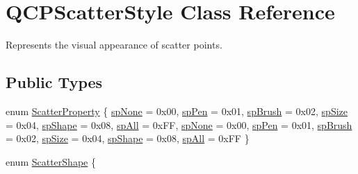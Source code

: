 \hypertarget{class_q_c_p_scatter_style}{}\section{Q\+C\+P\+Scatter\+Style Class Reference}
\label{class_q_c_p_scatter_style}


Represents the visual appearance of scatter points.  


\subsection*{Public Types}
\begin{DoxyCompactItemize}
\item 
enum \hyperlink{class_q_c_p_scatter_style_a8974f6a20f8f6eea7781f0e6af9deb46}{Scatter\+Property} \{ \newline
\hyperlink{class_q_c_p_scatter_style_a8974f6a20f8f6eea7781f0e6af9deb46a17a52f70663e0d2f4e1593d1e777a35d}{sp\+None} = 0x00, 
\hyperlink{class_q_c_p_scatter_style_a8974f6a20f8f6eea7781f0e6af9deb46a1b8f3179d60006d2bcfd4e14a3fcde79}{sp\+Pen} = 0x01, 
\hyperlink{class_q_c_p_scatter_style_a8974f6a20f8f6eea7781f0e6af9deb46afad8a949ce16cff5c03b83ba31345722}{sp\+Brush} = 0x02, 
\hyperlink{class_q_c_p_scatter_style_a8974f6a20f8f6eea7781f0e6af9deb46abb1c95b5c063a6208703b5f956f8944d}{sp\+Size} = 0x04, 
\newline
\hyperlink{class_q_c_p_scatter_style_a8974f6a20f8f6eea7781f0e6af9deb46acfd6bcce3cc09ebc10723b2408412087}{sp\+Shape} = 0x08, 
\hyperlink{class_q_c_p_scatter_style_a8974f6a20f8f6eea7781f0e6af9deb46a69453dd56c0b1b0f51c877820caceeaa}{sp\+All} = 0x\+FF, 
\hyperlink{class_q_c_p_scatter_style_a8974f6a20f8f6eea7781f0e6af9deb46a17a52f70663e0d2f4e1593d1e777a35d}{sp\+None} = 0x00, 
\hyperlink{class_q_c_p_scatter_style_a8974f6a20f8f6eea7781f0e6af9deb46a1b8f3179d60006d2bcfd4e14a3fcde79}{sp\+Pen} = 0x01, 
\newline
\hyperlink{class_q_c_p_scatter_style_a8974f6a20f8f6eea7781f0e6af9deb46afad8a949ce16cff5c03b83ba31345722}{sp\+Brush} = 0x02, 
\hyperlink{class_q_c_p_scatter_style_a8974f6a20f8f6eea7781f0e6af9deb46abb1c95b5c063a6208703b5f956f8944d}{sp\+Size} = 0x04, 
\hyperlink{class_q_c_p_scatter_style_a8974f6a20f8f6eea7781f0e6af9deb46acfd6bcce3cc09ebc10723b2408412087}{sp\+Shape} = 0x08, 
\hyperlink{class_q_c_p_scatter_style_a8974f6a20f8f6eea7781f0e6af9deb46a69453dd56c0b1b0f51c877820caceeaa}{sp\+All} = 0x\+FF
 \}
\item 
enum \hyperlink{class_q_c_p_scatter_style_adb31525af6b680e6f1b7472e43859349}{Scatter\+Shape} \{ \newline

\end{DoxyCompactItemize}
